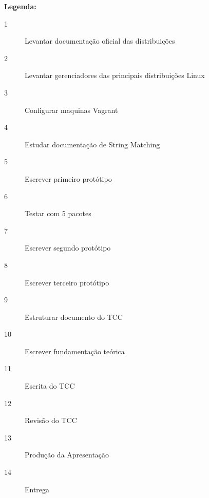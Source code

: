\textbf{Legenda:}
\begin{description}
\item [1]  Levantar documentação oficial das distribuições
\item [2]  Levantar gerenciadores das principais distribuições Linux
\item [3]  Configurar maquinas Vagrant
\item [4]  Estudar documentação de String Matching
\item [5]  Escrever primeiro protótipo
\item [6]  Testar com 5 pacotes
\item [7]  Escrever segundo protótipo
\item [8]  Escrever terceiro protótipo
\item [9]  Estruturar documento do TCC
\item [10] Escrever fundamentação teórica
\item [11] Escrita do TCC
\item [12] Revisão do TCC
\item [13] Produção da Apresentação
\item [14] Entrega
\end{description}